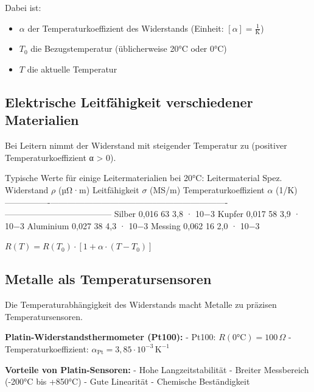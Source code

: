 \documentclass[
  11pt,
]{article}
\providecommand{\tightlist}{%
  \setlength{\itemsep}{0pt}\setlength{\parskip}{0pt}}
\begin{document}
Dabei ist:

\begin{itemize}
\tightlist
\item
  \(\alpha\) der Temperaturkoeffizient des Widerstands (Einheit:
  \([\alpha] = \frac{1}{\text{K}}\))
\item
  \(T_0\) die Bezugstemperatur (üblicherweise 20°C oder 0°C)
\item
  \(T\) die aktuelle Temperatur
\end{itemize}

\subsection{Elektrische Leitfähigkeit verschiedener
Materialien}\label{elektrische-leitfuxe4higkeit-verschiedener-materialien}

Bei Leitern nimmt der Widerstand mit steigender Temperatur zu (positiver
Temperaturkoeffizient α \textgreater{} 0).

Typische Werte für einige Leitermaterialien bei 20°C: \textbar{}
Leitermaterial \textbar{} Spez. Widerstand \(\rho\) (µΩ·m) \textbar{}
Leitfähigkeit \(\sigma\) (MS/m) \textbar{} Temperaturkoeffizient
\(\alpha\) (1/K) \textbar{}
\textbar----------------\textbar--------------------------------------\textbar-------------------------\textbar--------------------------------------\textbar{}
\textbar{} Silber \textbar{} 0,016 \textbar{} 63 \textbar{} 3,8 · 10−3
\textbar{} \textbar{} Kupfer \textbar{} 0,017 \textbar{} 58 \textbar{}
3,9 · 10−3 \textbar{} \textbar{} Aluminium \textbar{} 0,027 \textbar{}
38 \textbar{} 4,3 · 10−3 \textbar{} \textbar{} Messing \textbar{} 0,062
\textbar{} 16 \textbar{} 2,0 · 10−3 \textbar{}

\(R(T) = R(T_0) \cdot [1 + \alpha \cdot (T - T_0)]\)

\subsection{Metalle als
Temperatursensoren}\label{metalle-als-temperatursensoren}

Die Temperaturabhängigkeit des Widerstands macht Metalle zu präzisen
Temperatursensoren.

\textbf{Platin-Widerstandsthermometer (Pt100):} - Pt100:
\(R(0°\text{C}) = 100 \, \Omega\) - Temperaturkoeffizient:
\(\alpha_{\text{Pt}} = 3{,}85 \cdot 10^{-3} \, \text{K}^{-1}\)

\textbf{Vorteile von Platin-Sensoren:} - Hohe Langzeitstabilität -
Breiter Messbereich (-200°C bis +850°C) - Gute Linearität - Chemische
Beständigkeit
\end{document}
